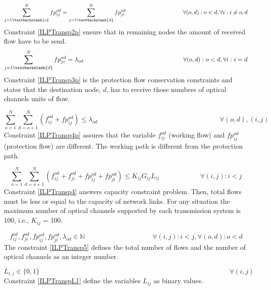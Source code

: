 \begin{equation}
\sum_{j=1\textbackslash \{o\}}^{N} fp_{ij}^{od} = \sum_{j=1\textbackslash \{d\}}^{N} fp_{ji}^{od} \qquad \qquad \qquad \qquad \qquad
\forall(o,d) : o < d, \forall i: i \neq o,d
\label{ILPTransp2p}
\end{equation}
\noindent
Constraint \ref{ILPTransp2p} ensure that in remaining nodes the amount of received flow have to be send.
\newpage
\begin{equation}
\sum_{j=1\textbackslash \{d\}}^{N} fp_{ji}^{od} = \lambda_{od} \qquad \qquad \qquad \qquad \qquad \qquad \qquad \qquad
\forall(o,d) : o < d, \forall i: i = d
\label{ILPTransp3p}
\end{equation}
\noindent
Constraint \ref{ILPTransp3p} is the protection flow conservation constraints and states that the destination node, $d$, has to receive those numbers of optical channels units of flow.

\begin{equation}
\sum_{o=1}^{N} \sum_{d=o+1}^{N} \left(f_{ij}^{od}  + fp_{ij}^{od}\right) \leq \lambda_{od}  \qquad \qquad \qquad \qquad \qquad \qquad \qquad \qquad \qquad
\forall (o,d), (i,j)
\label{ILPTransp4p}
\end{equation}
\noindent
Constraint \ref{ILPTransp4p} assures that the variable $f_{ij}^{od}$ (working flow) and $fp_{ij}^{od}$ (protection flow) are different. The working path is different from the protection path.

\begin{equation}
\sum_{o=1}^{N} \sum_{d=o+1}^{N} \left(f_{ij}^{od} + f_{ji}^{od} + fp_{ij}^{od} + fp_{ji}^{od}\right) \leq K_{ij} G_{ij} L_{ij} \qquad \qquad \qquad
\forall(i,j) : i < j
\label{ILPTransp4}
\end{equation}
\noindent
Constraint \ref{ILPTransp4} answers capacity constraint problem. Then, total flows must be less or equal to the capacity of network links. For any situation the maximum number of optical channels supported by each transmission system is 100, i.e., $K_{ij}$ = 100.

\begin{equation}
f_{ij}^{od} , f_{ji}^{od} , fp_{ij}^{od} , fp_{ji}^{od} , \lambda_{od} \in \mathbb{N}   \qquad \qquad \qquad \qquad \qquad
\forall(i,j) : i < j, \forall(o,d) : o < d
\label{ILPTransp5}
\end{equation}
\noindent
The constraint \ref{ILPTransp5} defines the total number of flows and the number of optical channels as an integer number.

\begin{equation}
L_{i,j} \in \{0,1\} \qquad \qquad \qquad \qquad \qquad \qquad \qquad \qquad \qquad \qquad \qquad \qquad \qquad \qquad
\forall(i,j)
\label{ILPTranspL1}
\end{equation}
\noindent
Constraint \ref{ILPTranspL1} define the variables $L_{ij}$ as binary values.\\

